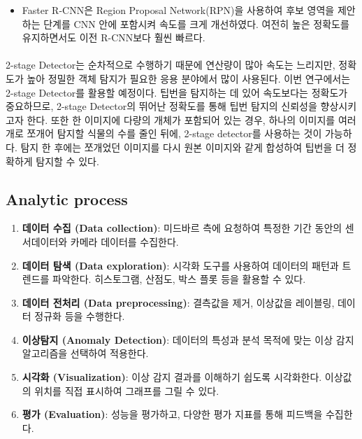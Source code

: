 \documentclass[11pt]{article}
\begin{document}
\begin{enumerate}
\begin{itemize}
        \item {Faster R-CNN은 Region Proposal Network(RPN)을 사용하여 후보 영역을 제안하는 단계를 CNN 안에 포함시켜 속도를 크게 개선하였다. 여전히 높은 정확도를 유지하면서도 이전 R-CNN보다 훨씬 빠르다.}
    \end{itemize}

    \paragraph{} 2-stage Detector는 순차적으로 수행하기 때문에 연산량이 많아 속도는 느리지만, 정확도가 높아 정밀한 객체 탐지가 필요한 응용 분야에서 많이 사용된다. 이번 연구에서는 2-stage Detector를 활용할 예정이다. 팁번을 탐지하는 데 있어 속도보다는 정확도가 중요하므로, 2-stage Detector의 뛰어난 정확도를 통해 팁번 탐지의 신뢰성을 향상시키고자 한다. 또한 한 이미지에 다량의 개체가 포함되어 있는 경우, 하나의 이미지를 여러개로 쪼개어 탐지할 식물의 수를 줄인 뒤에, 2-stage detector를 사용하는 것이 가능하다. 탐지 한 후에는 쪼개었던 이미지를 다시 원본 이미지와 같게 합성하여 팁번을 더 정확하게 탐지할 수 있다\citep{franchetti2022detection}.

     \end{enumerate}

    \subsection{Analytic process}
    \begin{enumerate}
    \item \textbf{데이터 수집 (Data collection)}: 미드바르 측에 요청하여 특정한 기간 동안의 센서데이터와 카메라 데이터를 수집한다.
    \item \textbf{데이터 탐색 (Data exploration)}: 시각화 도구를 사용하여 데이터의 패턴과 트렌드를 파악한다. 히스토그램, 산점도, 박스 플롯 등을 활용할 수 있다.
    \item \textbf{데이터 전처리 (Data preprocessing)}: 결측값을 제거, 이상값을 레이블링, 데이터 정규화 등을 수행한다.
    \item \textbf{이상탐지 (Anomaly Detection)}: 데이터의 특성과 분석 목적에 맞는 이상 감지 알고리즘을 선택하여 적용한다.
    \item \textbf{시각화 (Visualization)}: 이상 감지 결과를 이해하기 쉽도록 시각화한다. 이상값의 위치를 직접 표시하여 그래프를 그릴 수 있다.
    \item \textbf{평가 (Evaluation)}: 성능을 평가하고, 다양한 평가 지표를 통해 피드백을 수집한다.
\end{enumerate}
\end{document}
